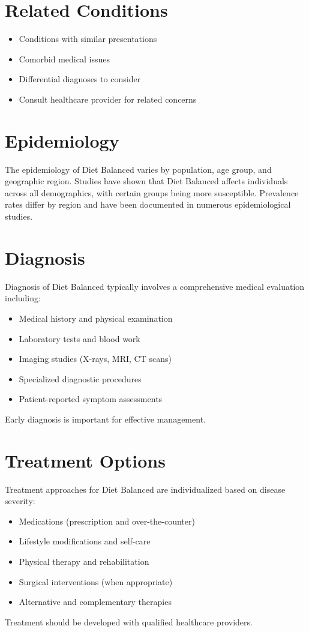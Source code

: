 \section*{Related Conditions}
\begin{itemize}
  \item Conditions with similar presentations
  \item Comorbid medical issues
  \item Differential diagnoses to consider
  \item Consult healthcare provider for related concerns
\end{itemize}

\section*{Epidemiology}
The epidemiology of Diet Balanced varies by population, age group, and geographic region. Studies have shown that Diet Balanced affects individuals across all demographics, with certain groups being more susceptible. Prevalence rates differ by region and have been documented in numerous epidemiological studies.

\section*{Diagnosis}
Diagnosis of Diet Balanced typically involves a comprehensive medical evaluation including:
\begin{itemize}
  \item Medical history and physical examination
  \item Laboratory tests and blood work
  \item Imaging studies (X-rays, MRI, CT scans)
  \item Specialized diagnostic procedures
  \item Patient-reported symptom assessments
\end{itemize}
Early diagnosis is important for effective management.

\section*{Treatment Options}
Treatment approaches for Diet Balanced are individualized based on disease severity:
\begin{itemize}
  \item Medications (prescription and over-the-counter)
  \item Lifestyle modifications and self-care
  \item Physical therapy and rehabilitation
  \item Surgical interventions (when appropriate)
  \item Alternative and complementary therapies
\end{itemize}
Treatment should be developed with qualified healthcare providers.

